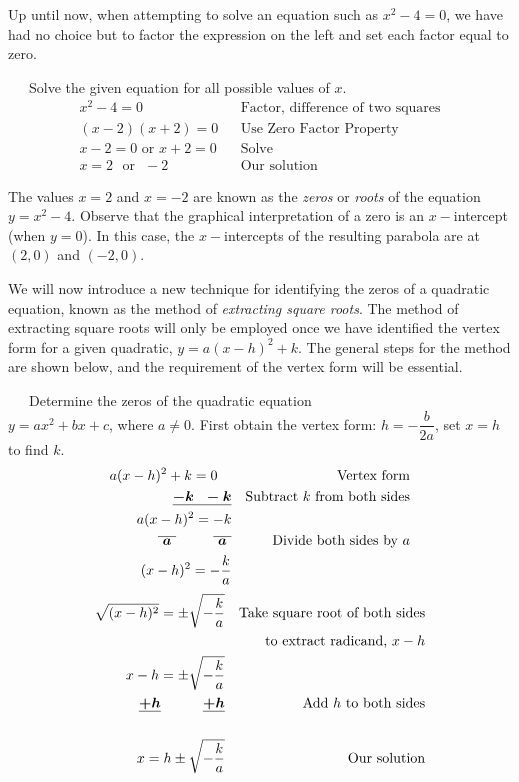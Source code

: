 {}\pp

Up until now, when attempting to solve an equation such as $x^2-4=0$, we have had no choice but to factor the expression on the left and set each factor equal to zero.
\begin{example}~~~Solve the given equation for all possible values of $x$.
\begin{eqnarray*}
x^2-4=0 & & \text{Factor,~difference~of~two~squares}\\
(x-2)(x+2)=0 & & \text{Use~Zero~Factor~Property}\\
x-2=0 \text{~or~} x+2=0 & & \text{Solve}\\
x=2 \text{~~or~~} -2 & & \text{Our~solution}
\end{eqnarray*}
\end{example}

The values $x=2$ and $x=-2$ are known as the \textit{zeros} or \textit{roots} of the equation $y=x^2-4$.  Observe that the graphical interpretation of a zero is an $x-$intercept (when $y=0$).  In this case, the $x-$intercepts of the resulting parabola are at $(2,0)$ and $(-2,0)$.\pp

We will now introduce a new technique for identifying the zeros of a quadratic equation, known as the method of \textit{extracting square roots}.  The method of extracting square roots will only be employed once we have identified the vertex form for a given quadratic, $y=a(x-h)^2+k$.  The general steps for the method are shown below, and the requirement of the vertex form will be essential.


\begin{example}~~~Determine the zeros of the quadratic equation\\ $y=ax^2+bx+c$, where $a\neq 0$.\pp
First obtain the vertex form:  $h=-\dfrac{b}{2a}$, set $x=h$ to find $k$.
\begin{eqnarray*}
a(x-h)^2+k=0~~~ & &\text{Vertex~form}\\
\tmmathbf{\underline{-k~~-k}} & & \text{Subtract~} k \text{~from~both~sides}\\
a(x-h)^2=-k & &\\
\tmmathbf{\overline{~a~}~~~~~~~~\overline{~a~}} & &  \text{Divide~both~sides~by~} a\\
(x-h)^2=-\frac{k}{a}& &%
\end{eqnarray*}
\begin{eqnarray*}
\sqrt{(x-h)^2}=\pm\sqrt{-\frac{k}{a}}& &\text{Take~square~root~of~both~sides}\\
& & ~~~\text{to~extract~radicand,~} x-h\\
x-h=\pm\sqrt{-\frac{k}{a}} & & \\
\boldsymbol{\underline{+h}~~~~~~~~~\underline{+h}} & & \text{Add~} h \text{~to~both~sides}\\
& &\\
x=h\pm\sqrt{-\frac{k}{a}} & & \text{Our~solution}
\end{eqnarray*}
\end{example}

